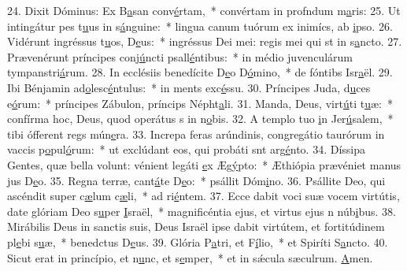 24. Dixit Dóminus: Ex B\uline{a}san conv\uline{é}rtam,~* convértam in profndum m\uline{a}ris:
25. Ut intingátur pes t\uline{u}us in s\uline{á}nguine:~* lingua canum tuórum ex inimícs, ab \uline{i}pso.
26. Vidérunt ingréssus t\uline{u}os, D\uline{e}us:~* ingréssus Dei mei: regis mei qui st in s\uline{a}ncto.
27. Prævenérunt príncipes conj\uline{ú}ncti psall\uline{é}ntibus:~* in médio juvenculárum tympanstri\uline{á}rum.
28. In ecclésiis benedícite D\uline{e}o D\uline{ó}mino,~* de fóntibs Isr\uline{a}ël.
29. Ibi Bénjamin ad\uline{o}lesc\uline{é}ntulus:~* in ments exc\uline{é}ssu.
30. Príncipes Juda, d\uline{u}ces e\uline{ó}rum:~* príncipes Zábulon, príncips Népht\uline{a}li.
31. Manda, Deus, virt\uline{ú}ti t\uline{u}æ:~* confírma hoc, Deus, quod operátus s in n\uline{o}bis.
32. A templo tuo \uline{i}n Jer\uline{ú}salem,~* tibi ófferent regs mún\uline{e}ra.
33. Increpa feras arúndinis, congregátio taurórum in vaccis p\uline{o}pul\uline{ó}rum:~* ut exclúdant eos, qui probáti snt arg\uline{é}nto.
34. Díssipa Gentes, quæ bella volunt: vénient legáti \uline{e}x Æg\uline{ý}pto:~* Æthiópia prævéniet manus jus D\uline{e}o.
35. Regna terræ, cant\uline{á}te D\uline{e}o:~* psállit Dóm\uline{i}no.
36. Psállite Deo, qui ascéndit super c\uline{æ}lum c\uline{æ}li,~* ad ri\uline{é}ntem.
37. Ecce dabit voci suæ vocem virtútis, date glóriam Deo s\uline{u}per \uline{I}sraël,~* magnificéntia ejus, et virtus ejus n núb\uline{i}bus.
38. Mirábilis Deus in sanctis suis, Deus Israël ipse dabit virtútem, et fortitúdinem pl\uline{e}bi s\uline{u}æ,~* benedctus D\uline{e}us.
39. Glória P\uline{a}tri, et F\uline{í}lio,~* et Spiríti S\uline{a}ncto.
40. Sicut erat in princípio, et n\uline{u}nc, et s\uline{e}mper,~* et in sǽcula sæculrum. \uline{A}men.
